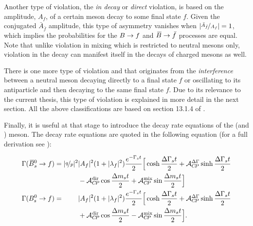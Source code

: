 Another type of \CP violation, the {\it in decay} or {\it direct} \CP violation, is based on the
amplitude, $A_f$, of a certain meson decay to some final state $f$. Given the \CP conjugated $\bar{A}_{\bar{f}}$
amplitude, this type of \CP asymmetry vanishes when $|\nicefrac{\bar{A}_{\bar{f}}}{A_f}| = 1$,
which implies the probabilities for the $B \rightarrow f$ and $\kern 0.18em\overline{\kern -0.18em B}{} \rightarrow \bar{f}$ processes are equal.
Note that unlike \CP violation in mixing which is restricted to neutral mesons only,
\CP violation in the decay can manifest itself in the decays of charged mesons as well.

There is one more type of \CP violation and that originates from the {\it interference} between
a neutral meson decaying directly to a final state $f$ or oscillating to its antiparticle and then decaying
to the same final state $f$. Due to its relevance to the current thesis, this type of \CP violation is explained
in more detail in the next section. All the above classifications are based on section 13.1.4 of \cite{PDG}.

Finally, it is useful at that stage to introduce the decay rate equations of the \Bs (and \Bsb) meson.
The decay rate equations are quoted in the following equation (for a full derivation see \cite{PDG,DeBruyn-thesis,jeroenThesis}):

\newcommand{\ampSq}{\ensuremath{|A_f|^2}\xspace}
\newcommand{\ampBSq}{\ensuremath{|\bar{A}_f|^2}\xspace}
\newcommand{\lambSq}{\ensuremath{|\lambda_f|^2}\xspace}
\newcommand{\eGammast}{\ensuremath{e^{-\Gamma_s t}}\xspace}
\newcommand{\qopSq}{\ensuremath{|\qoverp|^2}\xspace}
\newcommand{\DeltaGammat}{\ensuremath{\frac{\Delta\Gamma_s t}{2}}\xspace}
\newcommand{\DeltaMt}{\ensuremath{\frac{\Delta m_s t}{2}}\xspace}

\begin{subequations}
 \label{decay_rate_master_eqs}
 \begin{align}
 \centering
    \Gamma(\Bsb \to f) =          \qopSq & \ampSq (1+\lambSq) \frac{\eGammast}{2} \Big[ \cosh\DeltaGammat + \Acp{\Delta\Gamma}\sinh\DeltaGammat \nonumber \\
                                         &  - \Acp{\rm dir}\cos\DeltaMt + \Acp{\rm mix}\sin\DeltaMt \Big]  \\
    \Gamma(\Bs \to f) = \phantom{\qopSq} & \ampSq (1+\lambSq) \frac{\eGammast}{2} \Big[ \cosh\DeltaGammat + \Acp{\Delta\Gamma}\sinh\DeltaGammat \nonumber  \\
                                         & + \Acp{\rm dir}\cos\DeltaMt - \Acp{\rm mix}\sin\DeltaMt \Big].
 \end{align}
\end{subequations}

